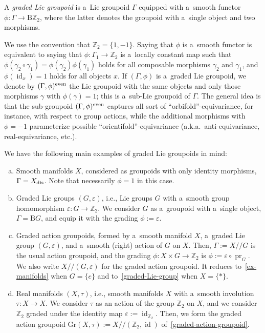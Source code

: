 \documentclass[pdftex]{sigma}
\numberwithin{equation}{section}
\def\Z {\mathbb{Z}}
\def\act#1#2{#1/\!\!/#2}
\newcommand{\pr}{\operatorname{pr}}
\newcommand{\id}{\operatorname{id}}
\begin{document}
\begin{Definition}
\label{graded-groupoid}
 A \emph{graded Lie groupoid} is a~Lie groupoid $\Gamma$ equipped with a~smooth functor
 $\phi \colon \Gamma \to \mathrm{B}\mathbb{Z}_2$, where the latter denotes the groupoid with a~single object and two morphisms.
\end{Definition}

We use the convention that $\Z_2=\{1,-1\}$. Saying that $\phi$ is a~smooth functor is equivalent to saying that $\phi\colon \Gamma_1 \to \Z_2$ is a~locally constant map such that $\phi(\gamma_2\circ\gamma_1)=\phi(\gamma_2)\phi(\gamma_1)$ holds for all composable morphisms $\gamma_2$ and $\gamma_1$, and $\phi(\id_x)=1$ holds for all objects $x$. If $(\Gamma,\phi)$ is a~graded Lie groupoid, we denote by $(\Gamma,\phi)^{\rm even}$ the Lie groupoid with the same objects and only those morphisms $\gamma$ with $\phi(\gamma)=1$; this is a~sub-Lie groupoid of $\Gamma$.
The general idea is that the sub-groupoid $(\Gamma,\phi)^{\rm even}$ captures all sort of ``orbifold''-equivariance, for instance, with respect to group actions, while the additional morphisms with $\phi=-1$ parameterize possible ``orientifold''-equivariance (a.k.a.\ anti-equivariance, real-equivariance, etc.).

\begin{Example}\label{ex1}
We have the following main examples of graded Lie groupoids in mind:
\begin{enumerate}[(a)]\itemsep=0pt
\item
\label{ex-manifolds}
Smooth manifolds $X$, considered as groupoids with only identity morphisms, $\Gamma=X_{\rm dis}$. Note that necessarily $\phi=1$ in this case.

\item
\label{graded-Lie-group}
Graded Lie groups $(G,\varepsilon)$, i.e., Lie groups $G$ with a~smooth group homomorphism $\varepsilon\colon G \to \Z_2$. We consider $G$ as a~groupoid with a~single object, $\Gamma=\mathrm{B}G$, and equip it with the grading $\phi := \varepsilon$.

\item
\label{graded-action-groupoid}
Graded action groupoids, formed by a~smooth manifold $X$, a~graded Lie group $(G,\varepsilon)$, and a~smooth (right) action of $G$ on $X$. Then, $\Gamma := \act XG$ is the usual action groupoid, and the grading $\phi\colon X \times G \to \Z_2$ is $\phi := \varepsilon \circ \pr_G$. We also write $\act X{(G,\varepsilon)}$ for the graded action groupoid. It reduces to~\ref{ex-manifolds} when $G=\{e\}$ and to~\ref{graded-Lie-group} when $X=\{\ast\}$.

\item
\label{real-manifold}
Real manifolds $(X,\tau)$, i.e., smooth manifolds $X$ with a~smooth involution $\tau\colon X \to X$. We consider $\tau$ as an action of the group $\Z_2$ on $X$, and we consider $\Z_2$ graded under the identity map $\varepsilon:=\id_{\Z_2}$. Then, we form the graded action groupoid $\mathrm{Gr}(X,\tau) :=\act X{(\Z_2,\id)}$ of~\ref{graded-action-groupoid}.
\end{enumerate}
\end{Example}
\end{document}
